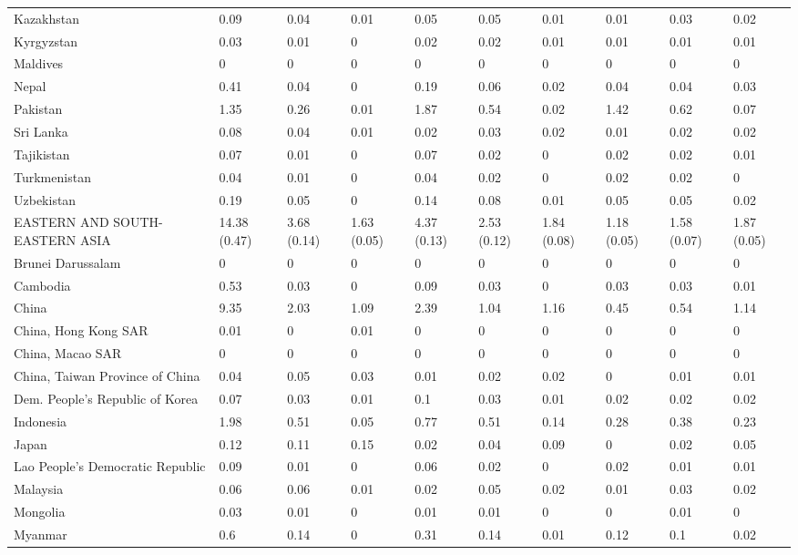 \begin{longtable}[t]{llllllllll}
Kazakhstan & 0.09 & 0.04 & 0.01 & 0.05 & 0.05 & 0.01 & 0.01 & 0.03 & 0.02\\
Kyrgyzstan & 0.03 & 0.01 & 0 & 0.02 & 0.02 & 0.01 & 0.01 & 0.01 & 0.01\\
Maldives & 0 & 0 & 0 & 0 & 0 & 0 & 0 & 0 & 0\\
Nepal & 0.41 & 0.04 & 0 & 0.19 & 0.06 & 0.02 & 0.04 & 0.04 & 0.03\\
Pakistan & 1.35 & 0.26 & 0.01 & 1.87 & 0.54 & 0.02 & 1.42 & 0.62 & 0.07\\
Sri Lanka & 0.08 & 0.04 & 0.01 & 0.02 & 0.03 & 0.02 & 0.01 & 0.02 & 0.02\\
Tajikistan & 0.07 & 0.01 & 0 & 0.07 & 0.02 & 0 & 0.02 & 0.02 & 0.01\\
Turkmenistan & 0.04 & 0.01 & 0 & 0.04 & 0.02 & 0 & 0.02 & 0.02 & 0\\
Uzbekistan & 0.19 & 0.05 & 0 & 0.14 & 0.08 & 0.01 & 0.05 & 0.05 & 0.02\\
EASTERN AND SOUTH-EASTERN ASIA & 14.38 (0.47) & 3.68 (0.14) & 1.63 (0.05) & 4.37 (0.13) & 2.53 (0.12) & 1.84 (0.08) & 1.18 (0.05) & 1.58 (0.07) & 1.87 (0.05)\\
Brunei Darussalam & 0 & 0 & 0 & 0 & 0 & 0 & 0 & 0 & 0\\
Cambodia & 0.53 & 0.03 & 0 & 0.09 & 0.03 & 0 & 0.03 & 0.03 & 0.01\\
China & 9.35 & 2.03 & 1.09 & 2.39 & 1.04 & 1.16 & 0.45 & 0.54 & 1.14\\
China, Hong Kong SAR & 0.01 & 0 & 0.01 & 0 & 0 & 0 & 0 & 0 & 0\\
China, Macao SAR & 0 & 0 & 0 & 0 & 0 & 0 & 0 & 0 & 0\\
China, Taiwan Province of China & 0.04 & 0.05 & 0.03 & 0.01 & 0.02 & 0.02 & 0 & 0.01 & 0.01\\
Dem. People's Republic of Korea & 0.07 & 0.03 & 0.01 & 0.1 & 0.03 & 0.01 & 0.02 & 0.02 & 0.02\\
Indonesia & 1.98 & 0.51 & 0.05 & 0.77 & 0.51 & 0.14 & 0.28 & 0.38 & 0.23\\
Japan & 0.12 & 0.11 & 0.15 & 0.02 & 0.04 & 0.09 & 0 & 0.02 & 0.05\\
Lao People's Democratic Republic & 0.09 & 0.01 & 0 & 0.06 & 0.02 & 0 & 0.02 & 0.01 & 0.01\\
Malaysia & 0.06 & 0.06 & 0.01 & 0.02 & 0.05 & 0.02 & 0.01 & 0.03 & 0.02\\
Mongolia & 0.03 & 0.01 & 0 & 0.01 & 0.01 & 0 & 0 & 0.01 & 0\\
Myanmar & 0.6 & 0.14 & 0 & 0.31 & 0.14 & 0.01 & 0.12 & 0.1 & 0.02\\

\end{longtable}
